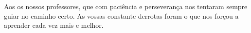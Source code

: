 \agradecimentos
Aos os nossos professores, que com paciência e perseverança nos tentaram sempre guiar no caminho certo. As vossas constante derrotas foram o que nos forçou a aprender cada vez mais e melhor.\\
